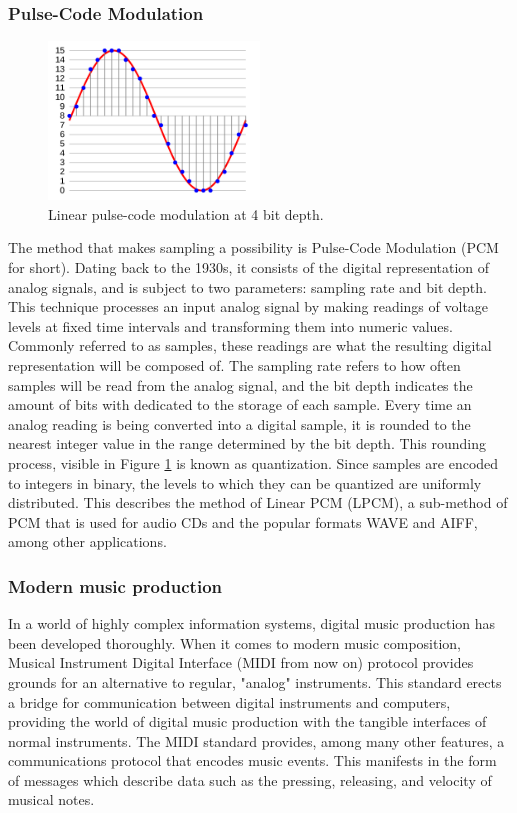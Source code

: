 \documentclass[12pt, a4paper, hidelinks]{article}
\begin{document}
	\subsubsection{Pulse-Code Modulation}
	\begin{figure}[h]
		\centering
		\includegraphics[width=0.5\textwidth]{pcm.png}
		\caption{Linear pulse-code modulation at 4 bit depth.}
		\label{fig:pcm}
	\end{figure}
	The method that makes sampling a possibility is Pulse-Code Modulation (PCM for short). Dating back to the 1930s, it consists of the digital representation of analog signals, and is subject to two parameters: sampling rate and bit depth. This technique processes an input analog signal by making readings of voltage levels at fixed time intervals and transforming them into numeric values. Commonly referred to as samples, these readings are what the resulting digital representation will be composed of. The sampling rate refers to how often samples will be read from the analog signal, and the bit depth indicates the amount of bits with dedicated to the storage of each sample. Every time an analog reading is being converted into a digital sample, it is rounded to the nearest integer value in the range determined by the bit depth. This rounding process, visible in Figure \ref{fig:pcm} \cite{pcm_img} is known as quantization. Since samples are encoded to integers in binary, the levels to which they can be quantized are uniformly distributed. This describes the method of Linear PCM (LPCM), a sub-method of PCM that is used for audio CDs and the popular formats WAVE and AIFF, among other applications.\par
	

	
	\subsubsection{Modern music production} 	
 	In a world of highly complex information systems, digital music production has been developed thoroughly. When it comes to modern music composition, Musical Instrument Digital Interface (MIDI from now on) %
 	protocol provides grounds for an alternative to regular, "analog" instruments. This standard erects a bridge for communication between digital instruments and computers, providing the world of digital music production with the tangible interfaces of normal instruments. The MIDI standard provides, among many other features, a communications protocol that encodes music events. This manifests in the form of messages which describe data such as the pressing, releasing, and velocity of musical notes. 	
	 	
\end{document}
